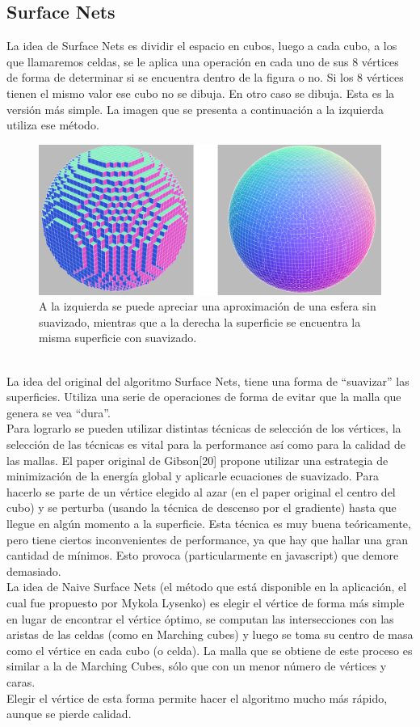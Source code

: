\documentclass[12pt]{article}
\begin{document}
\subsection{Surface Nets}
La idea de Surface Nets es dividir el espacio en cubos, luego a cada cubo, a los que llamaremos celdas, se le aplica una operación en cada uno de sus 8 vértices de forma de determinar si se encuentra dentro de la figura o no. Si los 8 vértices tienen el mismo valor ese cubo no se dibuja. En otro caso se dibuja. Esta es la versión más simple. La imagen que se presenta a continuación a la izquierda utiliza ese método.
\begin{figure}[h]
\includegraphics[width =\linewidth,center]{snc.png}
\caption{ A la izquierda se puede apreciar una aproximación de una esfera sin suavizado, mientras que a la derecha la superficie se encuentra la misma superficie con suavizado.}
\label{ fig : surface }
\end{figure}
\\La idea del original del algoritmo Surface Nets\cite{surfacenets}, tiene una forma de “suavizar” las superficies. Utiliza una serie de operaciones de forma de evitar que la malla que genera se vea “dura”.
\\Para lograrlo se pueden utilizar distintas técnicas de selección de los vértices, la selección de las técnicas es vital para la performance así como para la calidad de las mallas. El paper original de Gibson[20]  propone utilizar una estrategia de minimización de la energía global y aplicarle ecuaciones de suavizado. Para hacerlo se parte de un vértice elegido al azar (en el paper original el centro del cubo)  y se perturba (usando la técnica de descenso por el gradiente) hasta que llegue en algún momento a la superficie. Esta técnica es muy buena teóricamente, pero tiene ciertos inconvenientes de performance, ya que hay que hallar una gran cantidad de mínimos. Esto provoca (particularmente en javascript) que demore demasiado.
\\La idea de Naive Surface Nets (el método que está disponible en la aplicación, el cual fue propuesto por Mykola Lysenko\cite{mykola1}\cite{mykola2}) es elegir el vértice de forma más simple  en lugar de encontrar el vértice óptimo, se computan las intersecciones con las aristas de las celdas (como en Marching cubes) y luego se toma su centro de masa como el vértice en cada cubo (o celda). La malla que se obtiene de este proceso es similar a la de Marching Cubes, sólo que con un menor número de vértices y caras. 
\\Elegir el vértice de esta forma permite hacer el algoritmo mucho más rápido, aunque se pierde calidad.
\end{document}
